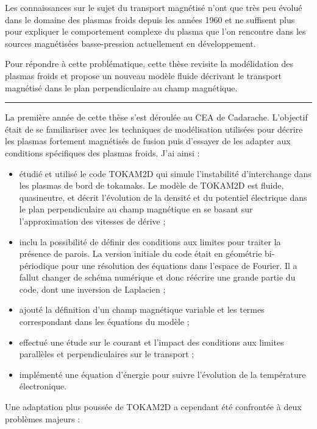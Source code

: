 Les connaissances sur le sujet du transport magnétisé n'ont que très peu évolué
dans le domaine des plasmas froids depuis les années 1960 et ne suffisent plus
pour expliquer le comportement complexe du plasma que l'on
rencontre dans les sources magnétisées basse-pression actuellement en développement.

Pour répondre à cette problématique, cette thèse revisite la modélidation
des plasmas froids et propose un nouveau modèle fluide décrivant le transport
magnétisé dans le plan perpendiculaire au champ magnétique.

\begin{center}
\rule{0.6\textwidth}{1pt}
\end{center}

La première année de cette thèse s'est déroulée au CEA de Cadarache.
L'objectif était de se familiariser avec les techniques de modélisation
utilisées pour décrire les plasmas fortement magnétisés de fusion puis d'essayer
de les adapter aux conditions spécifiques des plasmas froids. J'ai ainsi :

\begin{itemize}
  \item étudié et utilisé le code TOKAM2D qui simule
  l'instabilité d'interchange dans les plasmas de bord de tokamaks. Le 
  modèle de TOKAM2D est fluide, quasineutre, et décrit l'évolution de la
  densité et du potentiel électrique dans le plan perpendiculaire au champ
  magnétique en se basant sur l'approximation des vitesses de dérive ;
  \item inclu la possibilité de définir des conditions aux limites pour traiter
  la présence de parois.
  La version initiale du code était en géométrie bi-périodique pour une résolution des
  équations dans l'espace de Fourier. Il a fallut changer de schéma
  numérique et donc réécrire une grande partie du code, dont une inversion de
  Laplacien ;
  \item ajouté la définition d'un champ magnétique
  variable et les termes correspondant dans les équations du modèle ;
  \item effectué une étude sur le courant et l'impact des conditions aux
  limites parallèles et perpendiculaires sur le transport ;
  \item implémenté une équation d'énergie pour suivre l'évolution de la
  température électronique.
\end{itemize} 

 Une adaptation plus poussée de TOKAM2D a cependant été confrontée à deux
 problèmes majeurs :
 
